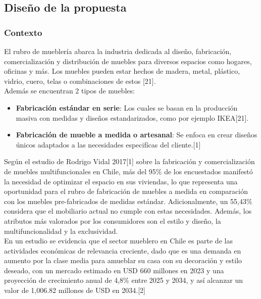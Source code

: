 \documentclass[12pt,oneside]{article}
\begin{document}
\endgroup

\subsection{Diseño de la propuesta}
\subsubsection{Contexto}
\onehalfspacing
\begingroup
El rubro de mueblería abarca la industria dedicada al diseño, fabricación, comercialización y distribución de muebles para diversos espacios como hogares, oficinas y más. Los muebles pueden estar hechos de madera, metal, plástico, vidrio, cuero, telas o combinaciones de estos [21].\\

\noindent Además se encuentran 2 tipos de muebles:
\begin{itemize}
    \item \textbf{Fabricación estándar en serie}: Los cuales se basan en la producción masiva con medidas y diseños estandarizados, como por ejemplo IKEA[21].

    \item  \textbf{Fabricación de mueble a medida o artesanal}: Se enfoca en crear diseños únicos adaptados a las necesidades especifícas del cliente.[1]
\end{itemize}

\noindent Según el estudio de Rodrigo Vidal 2017[1] sobre la fabricación y comercialización de muebles multifuncionales en Chile, más del 95\% de los encuestados manifestó la necesidad de optimizar el espacio en sus viviendas, lo que representa una oportunidad para el rubro de fabricación de muebles a medida en comparación con los muebles pre-fabricados de medidas estándar. Adicionalmente, un 55,43\% considera que el mobiliario actual no cumple con estas necesidades. Además, los atributos más valorados por los consumidores son el estilo y diseño, la multifuncionalidad y la exclusividad.\\

\noindent En un estudio se evidencia que el sector mueblero en Chile es parte de las actividades económicas de relevancia creciente, dado que es una demanda en aumento por la clase media para amueblar su casa con su decoración y estilo deseado, con un mercado estimado en USD 660 millones en 2023 y una proyección de crecimiento anual de 4,8\% entre 2025 y 2034, y así alcanzar un valor de 1,006.82 millones de USD en 2034.[2] \\
\end{document}
